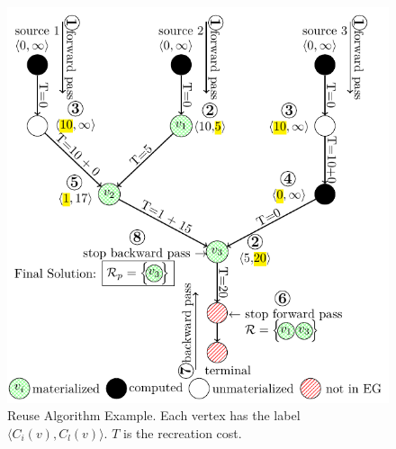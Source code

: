 \begin{figure}[ht]
\centering
\includegraphics[width=\linewidth]{images/tikz-standalone/reuse-algorithm}
\caption{Reuse Algorithm Example. Each vertex has the label $\langle C_i(v),C_l(v) \rangle$. $T$ is the recreation cost.}
\label{fig-reuse-algorithm}
\vspace{-4mm}
\end{figure}

